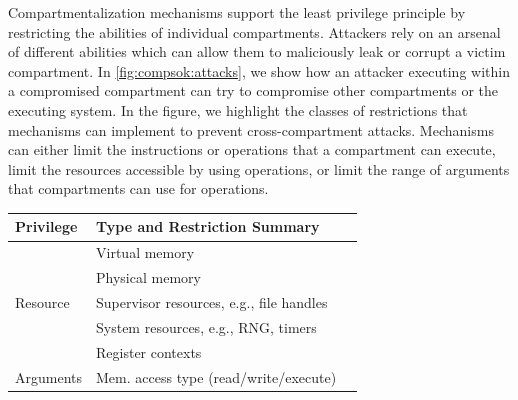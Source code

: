 Compartmentalization mechanisms support the least privilege principle 
by restricting the abilities of individual compartments.
Attackers rely on an arsenal of different abilities which can allow them
to maliciously leak or corrupt a victim compartment.
In \autoref{fig:compsok:attacks}, we show how an attacker executing
within a compromised compartment can try to compromise other compartments
or the executing system.
In the figure, we highlight the classes of restrictions that mechanisms can 
implement to prevent cross-compartment attacks.
Mechanisms can either limit the instructions or operations that a compartment
can execute, limit the resources accessible by using operations, or
limit the range of arguments that compartments can use for operations.

\begin{table}
  \centering
  \begin{tabular}{l| ll}
    \toprule
    \rowstyle{\bfseries}
    Privilege                   & Type and Restriction Summary                              \\
    \midrule
    \multirow{5}{*}{Resource}   & Virtual memory                                            \\
                                & Physical memory                                           \\
                                & Supervisor resources, e.g., file handles                  \\
                                & System resources, e.g., RNG, timers                       \\
                                & Register contexts                                         \\ \hline
    \multirow{5}{*}{Arguments}  & Mem. access type (read/write/execute)                     \\

\end{tabular}
\end{table}
